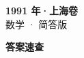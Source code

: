 \documentclass[zihao=-4, a4paper]{ctexart}
\begin{document}
\begin{center}
  {\Large\bfseries 1991 年·上海卷}\\[4pt]
  {\large 数学 · 简答版}
\end{center}
\medskip
{}

\clearpage
{}
\begin{center}{\Large\bfseries 答案速查}\end{center}
\medskip

\end{document}
